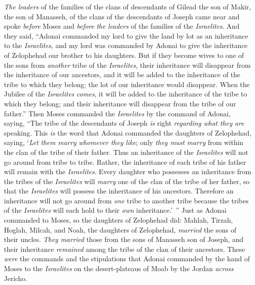 \begin{biblechapter} %
 \textit{The leaders} of the families of the clans of descendants of Gilead the son of Makir, the son of Manasseh, of the clans of the descendants of Joseph came near and spoke \textit{before} Moses and \textit{before} \textit{the leaders} of the families of the \textit{Israelites}.
\verse And they said, “Adonai commanded my lord to give the land by lot as an inheritance to the \textit{Israelites}, and my lord was commanded by Adonai to give the inheritance of Zelophehad our brother to his daughters.
\verse But if they become wives to one of the sons from \textit{another} tribe of the \textit{Israelites}, their inheritance will disappear from the inheritance of our ancestors, and it will be added to the inheritance of the tribe to which they belong; the lot of our inheritance would disappear.
\verse When the Jubilee of the \textit{Israelites} \textit{comes}, it will be added to the inheritance of the tribe to which they belong; and their inheritance will disappear from the tribe of our father.”
\verse Then Moses commanded the \textit{Israelites} by the command of Adonai, saying, “The tribe of the descendants of Joseph \textit{is} right \textit{regarding what they are} speaking.
\verse This \textit{is} the word that Adonai commanded the daughters of Zelophehad, saying, ‘\textit{Let them marry} \textit{whomever they like}; only \textit{they must marry} from within the clan of the tribe of their father.
\verse Thus an inheritance of the \textit{Israelites} will not go around from tribe to tribe. Rather, the inheritance of each tribe of his father will remain with the \textit{Israelites}.
\verse Every daughter who possesses an inheritance from the tribes of the \textit{Israelites} will \textit{marry} one of the clan of the tribe of her father, so that the \textit{Israelites} will possess the inheritance of his ancestors.
\verse Therefore an inheritance will not go around from \textit{one} tribe to another tribe because the tribes of the \textit{Israelites} will each hold to their \textit{own} inheritance.’ ”
\verse Just as Adonai commanded to Moses, so the daughters of Zelophehad did:
\verse Mahlah, Tirzah, Hoglah, Milcah, and Noah, the daughters of Zelophehad, \textit{married} the sons of their uncles.
\verse \textit{They married} those from the sons of Manasseh son of Joseph, and their inheritance \textit{remained} among the tribe of the clan of their ancestors.
\verse These \textit{were} the commands and the stipulations that Adonai commanded by the hand of Moses to the \textit{Israelites} on the desert-plateaus of Moab by the Jordan \textit{across} Jericho.
\end{biblechapter}

